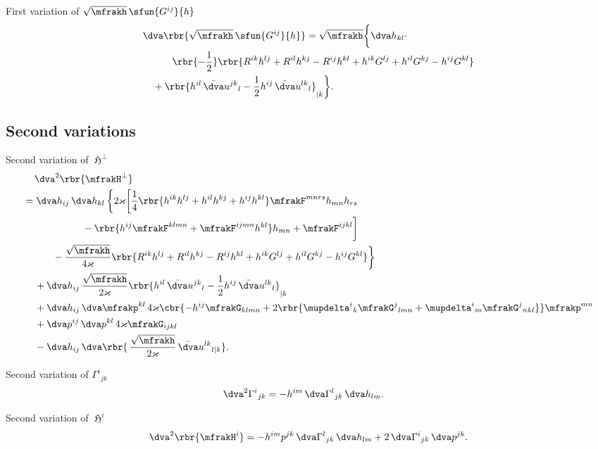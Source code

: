 \documentclass[a4paper,11pt]{article}
\begin{document}
First variation of $\sqrt{\mfrakh}\,\sfun{G^{ij}}{h}$
\begin{align}
&
\dva\rbr{\sqrt{\mfrakh}\,\sfun{G^{ij}}{h}}
= \sqrt{\mfrakh}\bigg\{\dva h_{kl}\cdot
\nonumber \\
&\qquad\quad
\rbr{-\frac{1}{2}}\rbr{
R^{ik}h^{lj}+R^{il}h^{kj}-R^{ij}h^{kl}+h^{ik}G^{lj}+h^{il}G^{kj}-h^{ij}G^{kl}}
\nonumber \\
&\quad
+\rbr{h^{il}\,\bar{\dva}u^{jk}{}_{l}
- \frac{1}{2}h^{ij}\,\bar{\dva}u^{lk}{}_{l}}_{|k} \bigg\}.
\end{align}

\subsection*{Second variations}

Second variation of $\mfrakH^\perp$
\begin{align}
&\quad\,
\dva^2\rbr{\mfrakH^\perp}
\nonumber \\
&= \dva h_{ij}\,\dva h_{kl}\,\bigg\{ 2\varkappa\bigg[
\frac{1}{4}\rbr{h^{ik}h^{lj}+h^{il}h^{kj}+h^{ij}h^{kl}} \mfrakF^{mnrs} 
h_{mn} h_{rs}
\nonumber \\
&\qquad\qquad\qquad
-\rbr{h^{ij}\mfrakF^{klmn}+\mfrakF^{ijmn}h^{kl}}h_{mn}
+\mfrakF^{ijkl} \bigg]
\nonumber \\
&\qquad\quad
-\frac{\sqrt{\mfrakh}}{4\varkappa}\rbr{
R^{ik}h^{lj}+R^{il}h^{kj}-R^{ij}h^{kl}+h^{ik}G^{lj}+h^{il}G^{kj}-h^{ij}G^{kl}}
\bigg\}
\nonumber \\
&\quad\,
+\dva h_{ij}\,\frac{\sqrt{\mfrakh}}{2\varkappa}
\rbr{h^{il}\,\bar{\dva}u^{jk}{}_{l}
- \frac{1}{2}h^{ij}\,\bar{\dva}u^{lk}{}_{l}}_{|k} 
\nonumber \\
&\quad\,
+\dva h_{ij}\,\dva \mfrakp^{kl}\,4\varkappa
\cbr{-h^{ij}\mfrakG_{klmn}+2\rbr{\mupdelta^i{}_k\mfrakG^{j}{}_{lmn} 
+\mupdelta^i{}_m\mfrakG^{j}{}_{nkl}} } \mfrakp^{mn}
\nonumber \\
&\quad\,
+\dva p^{ij}\,\dva p^{kl}\,4\varkappa \mfrakG_{ijkl}
\nonumber \\
&\quad\,
-\dva h_{ij}\,
\dva\rbr{\,\frac{\sqrt{\mfrakh}}{2\varkappa}\,\bar{\dva}u^{lk}{}_{l|k}}.
\end{align}

Second variation of $\Gamma^i{}_{jk}$
\begin{align}
\dva^2 \Gamma^i{}_{jk} &=
- h^{im} \,\dva\Gamma^{l}{}_{jk} \,\dva h_{lm}.
\end{align}

Second variation of $\mfrakH^i$
\begin{align}
\dva^2\rbr{\mfrakH^i} = -h^{im}p^{jk}
\,\dva\Gamma^{l}{}_{jk}\,\dva h_{lm} + 2\,\dva\Gamma^{i}{}_{jk}\,\dva p^{jk}.
\end{align}
\end{document}
